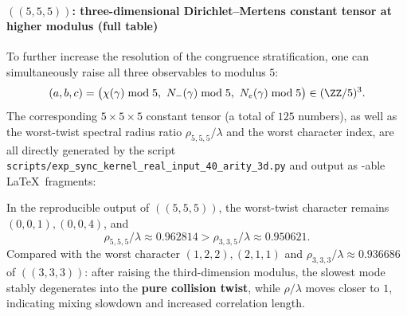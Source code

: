 \paragraph{\texorpdfstring{$((5,5,5))$}{(5,5,5)}: three-dimensional Dirichlet--Mertens constant tensor at higher modulus (full table)}
To further increase the resolution of the congruence stratification, one can simultaneously raise all three observables to modulus $5$:
$$
(a,b,c)=\bigl(\chi(\gamma)\bmod 5,\ N_-(\gamma)\bmod 5,\ N_e(\gamma)\bmod 5\bigr)\in(\ZZ/5)^3.
$$
The corresponding $5\times 5\times 5$ constant tensor (a total of $125$ numbers), as well as the worst-twist spectral radius ratio $\rho_{5,5,5}/\lambda$ and the worst character index, are all directly generated by the script
\texttt{scripts/exp\_sync\_kernel\_real\_input\_40\_arity\_3d.py}
and output as \verb||-able \LaTeX\ fragments:


\begin{remark}\label{cor:arity-555-collision-universal}
In the reproducible output of $((5,5,5))$, the worst-twist character remains $(0,0,1),(0,0,4)$, and
\[
\rho_{5,5,5}/\lambda\approx 0.962814> \rho_{3,3,5}/\lambda\approx 0.950621.
\]
Compared with the worst character $(1,2,2),(2,1,1)$ and $\rho_{3,3,3}/\lambda\approx 0.936686$ of $((3,3,3))$:
after raising the third-dimension modulus, the slowest mode stably degenerates into the \textbf{pure collision twist}, while $\rho/\lambda$ moves closer to $1$, indicating mixing slowdown and increased correlation length.
\end{remark}

